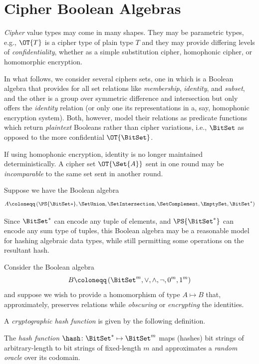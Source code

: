 \documentclass[ ../main.tex]{subfiles}
\begin{document}
\section{Cipher Boolean Algebras}

\emph{Cipher} value types may come in many shapes.
They may be parametric types, e.g., $\OT{T}$ is a cipher type of plain type $T$ and they may provide differing levels of \emph{confidentiality}, whether as a simple substitution cipher, homophonic cipher, or homomorphic encryption.

In what follows, we consider several ciphers sets, one in which is a Boolean algebra that provides for all set relations like \emph{membership}, \emph{identity}, and \emph{subset}, and the other is a group over symmetric difference and intersection but only offers the \emph{identity} relation (or only one its representations in a, say, homophonic encryption system).
Both, however, model their relations as predicate functions which return \emph{plaintext} Booleans rather than cipher variations, i.e., $\BitSet$ as opposed to the more confidential $\OT{\BitSet}$.

\begin{remark}
If using homophonic encryption, identity is no longer maintained deterministically. A cipher set $\OT{\Set{A}}$ sent in one round may be \emph{incomparable} to the same set sent in another round.
\end{remark}

Suppose we have the Boolean algebra
\begin{equation}
	A \coloneqq \left(\PS{\BitSet*}, \SetUnion, \SetIntersection, \SetComplement, \EmptySet, {\BitSet^*}\right)
\end{equation}

Since $\BitSet^*$ can encode any tuple of elements, and $\PS{\BitSet^*}$ can encode any sum type of tuples, this Boolean algebra may be a reasonable model for hashing algebraic data types, while still permitting some operations on the resultant hash.

Consider the Boolean algebra
\begin{equation}
	B \coloneqq \left(\BitSet^m, \lor, \land, \neg, 0^m, 1^m\right)
\end{equation}
and suppose we wish to provide a homomorphism of type $A \mapsto B$ that, approximately, preserves relations while \emph{obscuring} or \emph{encrypting} the identities.

A \emph{cryptographic hash function} is given by the following definition.
\begin{definition}
	The \emph{hash function} $\hash \colon {\BitSet^*} \mapsto \BitSet^m$ maps (hashes) bit
	strings of arbitrary-length to bit strings of fixed-length $m$ and approximates
	a \emph{random oracle} over its codomain.
\end{definition}
\end{document}
